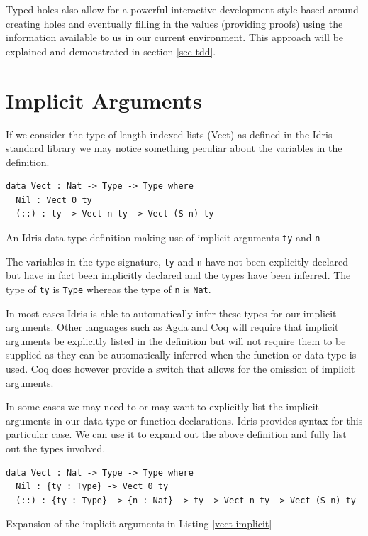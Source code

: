 \documentclass[a4paper, notitlepage]{report}
\begin{document}
Typed holes also allow for a powerful interactive development style based around
creating holes and eventually filling in the values (providing proofs) using the
information available to us in our current environment. This approach will be
explained and demonstrated in section \ref{sec-tdd}.

\section{Implicit Arguments}
\label{sec:org355c1b2}
If we consider the type of length-indexed lists (Vect) as defined in the Idris
standard library we may notice something peculiar about the variables in the
definition.

\begin{listing}[H]
\begin{verbatim}
data Vect : Nat -> Type -> Type where
  Nil : Vect 0 ty
  (::) : ty -> Vect n ty -> Vect (S n) ty
\end{verbatim}
\caption{An Idris data type definition making use of implicit arguments \texttt{ty} and \texttt{n} \label{vect-implicit}}
\end{listing}

The variables in the type signature, \texttt{ty} and \texttt{n} have not been explicitly declared
but have in fact been implicitly declared and the types have been inferred. The
type of \texttt{ty} is \texttt{Type} whereas the type of \texttt{n} is \texttt{Nat}.

In most cases Idris is able to automatically infer these types for our implicit
arguments. Other languages such as Agda and Coq will require that implicit
arguments be explicitly listed in the definition but will not require them to be
supplied as they can be automatically inferred when the function or data type is
used. Coq does however provide a switch that allows for the omission of implicit
arguments.

In some cases we may need to or may want to explicitly list the implicit
arguments in our data type or function declarations. Idris provides syntax for
this particular case. We can use it to expand out the above definition and fully
list out the types involved.

\begin{listing}[H]
\begin{verbatim}
data Vect : Nat -> Type -> Type where
  Nil : {ty : Type} -> Vect 0 ty
  (::) : {ty : Type} -> {n : Nat} -> ty -> Vect n ty -> Vect (S n) ty
\end{verbatim}
\caption{Expansion of the implicit arguments in Listing \ref{vect-implicit}}
\end{listing}
\end{document}
